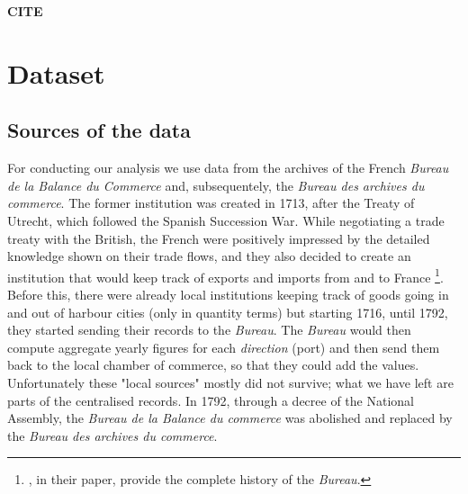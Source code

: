 \documentclass[12pt,a4paper,notitlepage,english]{article}
\begin{document}
\textbf{CITE \cite{juhasz2014temporary}}

\section{Dataset} \label{dataset}
\subsection{Sources of the data} \label{sources_of_data}
For conducting our analysis we use data from the archives of the French \textit{Bureau de la Balance du Commerce} and, subsequentely, the \textit{Bureau des archives du commerce}. The former institution was created in 1713, after the Treaty of Utrecht, which followed the Spanish Succession War. While negotiating a trade treaty with the British, the French were positively impressed by the detailed knowledge shown on their trade flows, and they also decided to create an institution that would keep track of exports and imports from and to France \citep{charles2011collecte}\footnote{\cite{charles2011collecte}, in their paper, provide the complete history of the \textit{Bureau}.}. Before this, there were already local institutions keeping track of goods going in and out of harbour cities (only in quantity terms) but starting 1716, until 1792, they started sending their records to the \textit{Bureau}. The \textit{Bureau} would then compute aggregate yearly figures for each \textit{direction} (port) and then send them back to the local chamber of commerce, so that they could add the values. Unfortunately these "local sources" mostly did not survive; what we have left are parts of the centralised records. In 1792, through a decree of the National Assembly, the \textit{Bureau de la Balance du commerce} was abolished and replaced by the \textit{Bureau des archives du commerce}.  \\
\end{document}
